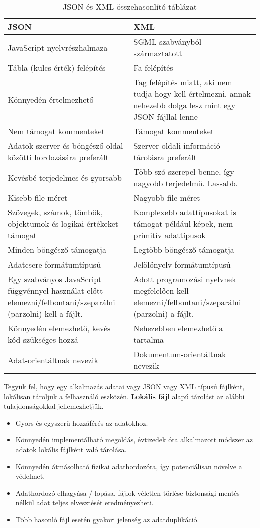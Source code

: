 \begin{table}[H]
	\centering
	\caption{JSON és XML összehasonlító táblázat}
	\label{tab:jsonandxml}
	\medskip
	\begin{tabular}{|p{7.2cm}|p{7.2cm}|}
		\hline
		\textbf{JSON} & \textbf{XML} \\
		\hline
		JavaScript nyelvrészhalmaza & SGML szabványból származtatott \\
		\hline
		Tábla (kulcs-érték) felépítés & Fa felépítés \\
		\hline
		Könnyedén értelmezhető & Tag felépítés miatt, aki nem tudja hogy kell értelmezni, annak nehezebb dolga lesz mint egy JSON fájllal lenne\\
		\hline
		Nem támogat kommenteket & Támogat kommenteket \\
		\hline
		Adatok szerver és böngésző oldal közötti hordozására preferált & Szerver oldali információ tárolásra preferált\\
		\hline
		Kevésbé terjedelmes és gyorsabb & Több szó szerepel benne, így nagyobb terjedelmű. Lassabb.\\
		\hline
		Kisebb file méret & Nagyobb file méret\\
		\hline
		Szövegek, számok, tömbök, objektumok és logikai értékeket támogat & Komplexebb adattípusokat is támogat például képek, nem-primitív adattípusok\\
		\hline
		Minden böngésző támogatja & Legtöbb böngésző támogatja\\
		\hline
		Adatcsere formátumtípusú & Jelölőnyelv formátumtípusú\\
		\hline
		Egy szabványos JavaScript függvénnyel használat előtt elemezni/felbontani/szeparálni (parzolni) kell a fájlt. & Adott programozási nyelvnek megfelelően kell elemezni/felbontani/szeparálni (parzolni) a fájlt.\\
		\hline
		Könnyedén elemezhető, kevés kód szükséges hozzá & Nehezebben elemezhető a tartalma\\
		\hline
		Adat-orientáltnak nevezik & Dokumentum-orientáltnak nevezik\\
		\hline
	\end{tabular}
\end{table}


\vspace{6pt}
\noindent Tegyük fel, hogy egy alkalmazás adatai vagy JSON vagy XML típusú fájlként, lokálisan tároljuk a felhasználó eszközén. \textbf{Lokális fájl} alapú tárolást az alábbi tulajdonságokkal jellemezhetjük.
\begin{itemize}
	\item Gyors és egyszerű hozzáférés az adatokhoz.
	\item Könnyedén implementálható megoldás, évtizedek óta alkalmazott módszer az adatok lokális fájlként való tárolása.
	\item Könnyedén átmásolható fizikai adathordozóra, így potenciálisan növelve a védelmet.
	\item Adathordozó elhagyása / lopása, fájlok véletlen törlése biztonsági mentés nélkül adat teljes elvesztését eredményezheti.
	\item Több hasonló fájl esetén gyakori jelenség az adatduplikáció. 
\end{itemize}


